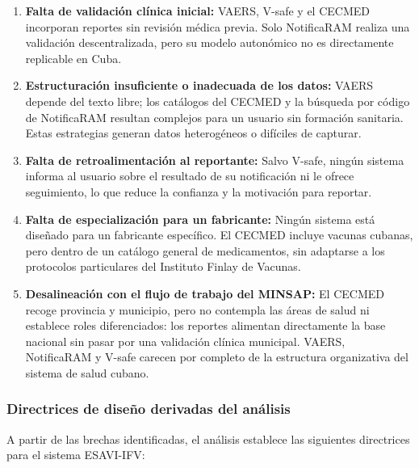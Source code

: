 \begin{enumerate}

\item \textbf{Falta de validación clínica inicial:} VAERS, V-safe y el CECMED incorporan reportes sin revisión médica previa. Solo NotificaRAM realiza una validación descentralizada, pero su modelo autonómico no es directamente replicable en Cuba.

\item \textbf{Estructuración insuficiente o inadecuada de los datos:} VAERS depende del texto libre; los catálogos del CECMED y la búsqueda por código de NotificaRAM resultan complejos para un usuario sin formación sanitaria. Estas estrategias generan datos heterogéneos o difíciles de capturar.

\item \textbf{Falta de retroalimentación al reportante:} Salvo V-safe, ningún sistema informa al usuario sobre el resultado de su notificación ni le ofrece seguimiento, lo que reduce la confianza y la motivación para reportar.

\item \textbf{Falta de especialización para un fabricante:} 
Ningún sistema está diseñado para un fabricante específico. El CECMED incluye vacunas cubanas, pero dentro de un catálogo general de medicamentos, sin adaptarse a los protocolos particulares del Instituto Finlay de Vacunas.

\item \textbf{Desalineación con el flujo de trabajo del MINSAP:} 
El CECMED recoge provincia y municipio, pero no contempla las áreas de salud ni establece roles diferenciados: los reportes alimentan directamente la base nacional sin pasar por una validación clínica municipal. VAERS, NotificaRAM y V-safe carecen por completo de la estructura organizativa del sistema de salud cubano.

\end{enumerate}

\subsubsection{Directrices de diseño derivadas del análisis}

A partir de las brechas identificadas, el análisis establece las siguientes directrices para el sistema ESAVI-IFV:


